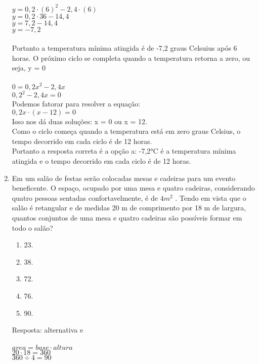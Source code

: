 \documentclass[a4paper,14pt]{article}
\begin{document}
\begin{enumerate}
        $y = 0,2 \cdot (6)^2 - 2,4 \cdot (6)$ \\
        $y = 0,2 \cdot 36 - 14,4$ \\
        $y = 7,2 - 14,4$ \\
        $y = -7,2$ \\ \\
        Portanto a temperatura mínima atingida é de -7,2 graus Celsuius após 6 horas. O próximo ciclo se completa quando a temperatura retorna a zero, ou seja, y = 0 \\ \\
        $0 = 0,2x^2 - 2,4x$ \\
        $0,2^2 - 2,4x = 0$ \\
        Podemos fatorar para resolver a equação: \\
        $0,2x \cdot (x - 12) = 0$ \\
        Isso nos dá duas soluções: x = 0 ou x = 12. \\
        Como o ciclo começa quando a temperatura está em zero graus Celsius, o tempo decorrido em cada ciclo é de 12 horas. \\
        Portanto a resposta correta é a opção a: -7,2°C é a temperatura mínima atingida e o tempo decorrido em cada ciclo é de 12 horas. \\
        \item Em um salão de festas serão colocadas mesas e cadeiras para um evento beneficente. O espaço,
        ocupado por uma mesa e quatro cadeiras, considerando quatro pessoas sentadas confortavelmente,
        é de $4m^2$
        .
        Tendo em vista que o salão é retangular e de medidas 20 m de comprimento por 18 m de largura, quantos
        conjuntos de uma mesa e quatro cadeiras são possíveis formar em todo o salão?
        \begin{enumerate}
			\item 23.
			\item 38.
			\item 72.
			\item 76.
			\item 90.
		\end{enumerate}
	    Resposta: alternativa e \\ \\
	    $area = base \cdot altura$ \\
	    $20 \cdot 18 = 360$ \\
	    $360 \div 4 = 90$
	

\end{enumerate}
\end{document}
